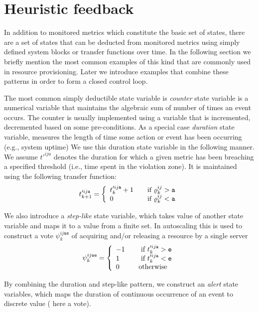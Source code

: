 
 \section{Heuristic feedback}  
In addition to monitored metrics which constitute the basic set of states, there are a set of states that can be deducted from monitored metrics using simply defined system blocks or transfer functions over time. In the following section we briefly  mention the most common examples of this kind that are commonly used in resource provisioning. Later we introduce examples that combine these patterns in order to form a closed control loop. 

The most common simply deductible state variable is \textit{counter} state variable is a numerical variable that maintains the algebraic sum of number of times an event occurs. The counter is usually implemented using a variable that is incremented, decremented based on some pre-conditions.
As a special case \textit{duration} state variable, measures the length of time some action or event has been occurring (e.g., system uptime)
We use  this duration state variable in the following manner. 
 We assume $t'^{ija}$ denotes the duration for which a given metric has been breaching a specified threshold (i.e., time spent in the violation zone).  It is maintained using the following transfer function: 
\[
  t'^{ij\mathtt{a}}_{k+1} = \left\{ 
  \begin{array}{l l}
    t'^{ij\mathtt{a}}_k+1 & \quad \text{if $\varrho^{ij}_k > \mathtt{a}$}\\
    0 & \quad \text{if $\varrho^{ij}_k < \mathtt{a}$}\\
  \end{array} \right.
\]

 We also introduce a \textit{step-like} state variable, which takes value of another state variable and maps it to a value from a finite set. 
In autoscaling this is used to construct a  vote $\psi^{ij\mathtt{a}\mathtt{e}}_k $ of acquiring and/or releasing a resource by a single server 
\[
\psi^{ij\mathtt{a}\mathtt{e}}_k = \left\{ 
 \begin{array}{l l}
    -1 & \quad \text{ if } t'^{ij\mathtt{a}}_k > \mathtt{e} \\
    1 & \quad \text{ if } t'^{ij\mathtt{a}}_k < \mathtt{e} \\
    0 & \quad \text{otherwise} \\
  \end{array} \right.
\]

 By combining the duration and step-like pattern, we construct an \textit{alert} state variables, which 
maps the duration of continuous occurrence of an event to discrete value ( here a vote). 
 
